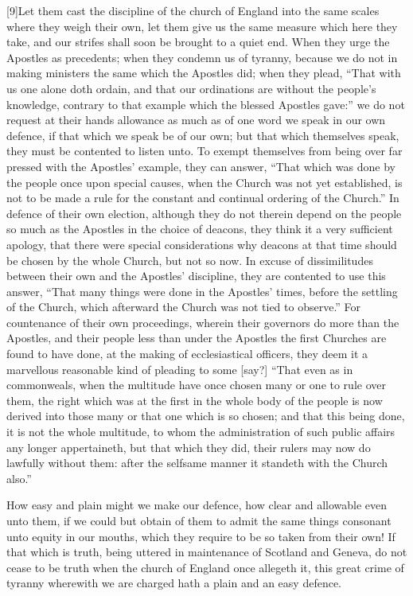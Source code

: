 [9]Let them cast the discipline of the church of England into the same scales where they weigh their own, let them give us the same measure which here they take, and our strifes shall soon be brought to a quiet end. When they urge the Apostles as precedents; when they condemn us of tyranny, because we do not in making ministers the same which the Apostles did; when they plead, “That with us one alone doth ordain, and that our ordinations are without the people’s knowledge, contrary to that example which the blessed Apostles gave:” we do not request at their  hands allowance as much as of one word we speak in our own defence, if that which we speak be of our own; but that which themselves speak, they must be contented to listen unto. To exempt themselves from being over far pressed with the Apostles’ example, they can answer, “That which was done by the people once upon special causes, when the Church was not yet established, is not to be made a rule for the constant and continual ordering of the Church.” In defence of their own election, although they do not therein depend on the people so much as the Apostles in the choice of deacons, they think it a very sufficient apology, that there were special considerations why deacons at that time should be chosen by the whole Church, but not so now. In excuse of dissimilitudes between their own and the Apostles’ discipline, they are contented to use this answer, “That many things were done in the Apostles’ times, before the settling of the Church, which afterward the Church was not tied to observe.” For countenance of their own proceedings, wherein their governors do more than the Apostles, and their people less than under the Apostles the first Churches are found to have done, at the making of ecclesiastical officers, they deem it a marvellous reasonable kind of pleading to some [say?] “That even as in commonweals, when the multitude have once chosen many or one to rule over them, the right which was at the first in the whole body of the people is now derived into those many or that one which is so chosen; and that this being done, it is not the whole multitude, to whom the administration of such public affairs any longer appertaineth, but that which they did, their rulers may now do lawfully without them: after the selfsame manner it standeth with the Church also.”

How easy and plain might we make our defence, how clear and allowable even unto them, if we could but obtain of them to admit the same things consonant unto equity in our mouths, which they require to be so taken from their own! If that which is truth, being uttered in maintenance of Scotland and Geneva, do not cease to be truth when the church of England once allegeth it, this great crime of tyranny wherewith we are charged hath a plain and an easy defence.

